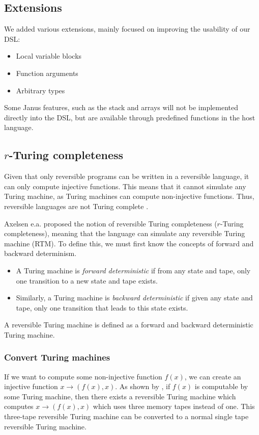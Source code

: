\documentclass[12pt,a4paper]{article}
\begin{document}
\subsection{Extensions}
We added various extensions, mainly focused on improving the usability of our DSL:

\begin{itemize}
	\item 
	Local variable blocks
	\item
	Function arguments
	\item
	Arbitrary types
\end{itemize}

Some Janus features, such as the stack and arrays will not be implemented directly into the DSL, but are available through predefined functions in the host language.

\subsection{$r$-Turing completeness}
Given that only reversible programs can be written in a reversible language, it can only compute injective functions. This means that it cannot simulate any Turing machine, as Turing machines can compute non-injective functions. Thus, reversible languages are not Turing complete \cite{axelsen11}.

Axelsen e.a. \cite{axelsen11} proposed the notion of reversible Turing completeness ($r$-Turing completeness), meaning that the language can simulate any reversible Turing machine (RTM). To define this, we must first know the concepts of forward and backward determinism.

\begin{itemize}
	\item A Turing machine is \textit{forward deterministic} if from any state and tape, only one transition to a new state and tape exists.
	\item Similarly, a Turing machine is \textit{backward deterministic} if given any state and tape, only one transition that leads to this state exists.
\end{itemize}

A reversible Turing machine is defined as a forward and backward deterministic Turing machine.

\subsubsection{Convert Turing machines}
If we want to compute some non-injective function $f(x)$, we can create an injective function $x \to (f(x), x)$. As shown by \cite{axelsen11}, if $f(x)$ is computable by some Turing machine, then there exists a reversible Turing machine which computes $x \to (f(x), x)$ which uses three memory tapes instead of one. This three-tape reversible Turing machine can be converted to a normal single tape reversible Turing machine.
\end{document}
